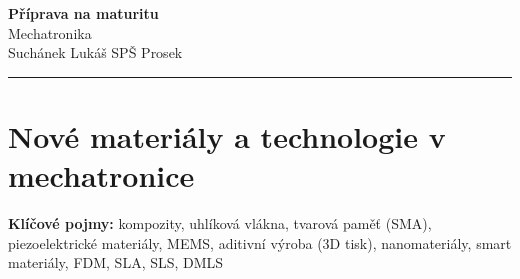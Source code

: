 \documentclass[a4paper,10pt]{article}
\begin{document}
\begin{minipage}[t]{0.75\textwidth}
    {\Huge\bfseries\color{accent} Příprava na maturitu}\\[4pt]
    {\large\color{stripeblue} Mechatronika}\\[2pt]
    \textcolor{medgray}{\small Suchánek Lukáš \quad SPŠ Prosek }
\end{minipage}
\hfill
\begin{minipage}[t]{0.22\textwidth}
    \raggedleft
\end{minipage}

\vspace{6pt}
\noindent\color{accent}\rule{\linewidth}{1.5pt}
\vspace{2pt}

\section{Nové materiály a technologie v mechatronice}

\begin{pojmybox}
\textbf{Klíčové pojmy:}
kompozity, uhlíková vlákna, tvarová paměť (SMA), piezoelektrické materiály,
MEMS, aditivní výroba (3D tisk), nanomateriály, smart materiály,
FDM, SLA, SLS, DMLS
\end{pojmybox}
\end{document}
